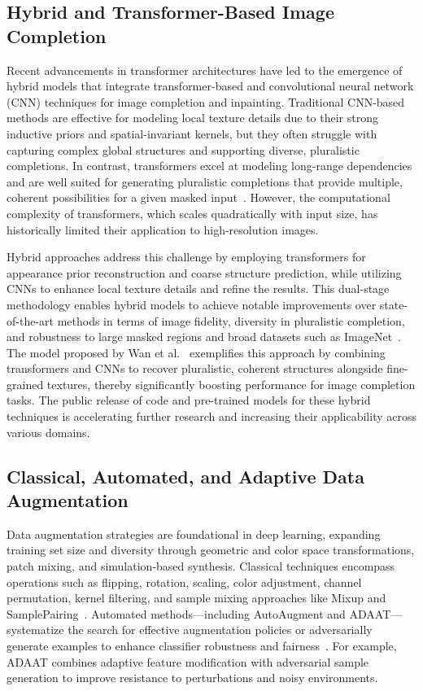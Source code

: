 \documentclass[sigconf]{acmart}
\begin{document}
\subsection{Hybrid and Transformer-Based Image Completion}

Recent advancements in transformer architectures have led to the emergence of hybrid models that integrate transformer-based and convolutional neural network (CNN) techniques for image completion and inpainting. Traditional CNN-based methods are effective for modeling local texture details due to their strong inductive priors and spatial-invariant kernels, but they often struggle with capturing complex global structures and supporting diverse, pluralistic completions. In contrast, transformers excel at modeling long-range dependencies and are well suited for generating pluralistic completions that provide multiple, coherent possibilities for a given masked input~\cite{ref92}. However, the computational complexity of transformers, which scales quadratically with input size, has historically limited their application to high-resolution images. 

Hybrid approaches address this challenge by employing transformers for appearance prior reconstruction and coarse structure prediction, while utilizing CNNs to enhance local texture details and refine the results. This dual-stage methodology enables hybrid models to achieve notable improvements over state-of-the-art methods in terms of image fidelity, diversity in pluralistic completion, and robustness to large masked regions and broad datasets such as ImageNet~\cite{ref92}. The model proposed by Wan et al.~\cite{ref92} exemplifies this approach by combining transformers and CNNs to recover pluralistic, coherent structures alongside fine-grained textures, thereby significantly boosting performance for image completion tasks. The public release of code and pre-trained models for these hybrid techniques is accelerating further research and increasing their applicability across various domains.

\subsection{Classical, Automated, and Adaptive Data Augmentation}

Data augmentation strategies are foundational in deep learning, expanding training set size and diversity through geometric and color space transformations, patch mixing, and simulation-based synthesis. Classical techniques encompass operations such as flipping, rotation, scaling, color adjustment, channel permutation, kernel filtering, and sample mixing approaches like Mixup and SamplePairing~\cite{ref54,ref55,ref61,ref64}. Automated methods—including AutoAugment and ADAAT—systematize the search for effective augmentation policies or adversarially generate examples to enhance classifier robustness and fairness~\cite{ref66,ref85}. For example, ADAAT combines adaptive feature modification with adversarial sample generation to improve resistance to perturbations and noisy environments.
\end{document}
